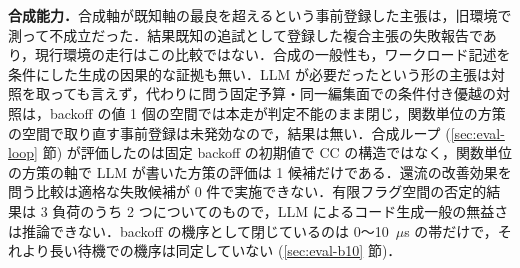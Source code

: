 \documentclass[submit,techrep,noauthor]{ipsj}
\begin{document}
\textbf{合成能力．}合成軸が既知軸の最良を超えるという事前登録した主張は，旧環境で測って不成立だった．結果既知の追試として登録した複合主張の失敗報告であり，現行環境の走行はこの比較ではない．合成の一般性も，ワークロード記述を条件にした生成の因果的な証拠も無い．LLM が必要だったという形の主張は対照を取っても言えず，代わりに問う固定予算・同一編集面での条件付き優越の対照は，backoff の値 1 個の空間では本走が判定不能のまま閉じ，関数単位の方策の空間で取り直す事前登録は未発効なので，結果は無い．合成ループ (\ref{sec:eval-loop} 節) が評価したのは固定 backoff の初期値で CC の構造ではなく，関数単位の方策の軸で LLM が書いた方策の評価は 1 候補だけである．還流の改善効果を問う比較は適格な失敗候補が 0 件で実施できない．有限フラグ空間の否定的結果は 3 負荷のうち 2 つについてのもので，LLM によるコード生成一般の無益さは推論できない．backoff の機序として閉じているのは 0〜10~$\mu$s の帯だけで，それより長い待機での機序は同定していない (\ref{sec:eval-b10} 節)．
\end{document}
